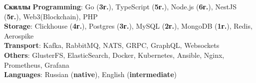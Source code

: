 \documentclass{resume}
\begin{document}
\begin{rSection}{\textbf{Скиллы}}
    \textbf{Programming}: Go ({\textbf{3г.}}), TypeScript ({\textbf{5г.}}), Node.js ({\textbf{6г.}}), NestJS ({\textbf{5г.}}), Web3(Blockchain), PHP
    \\ \textbf{Storage}: Clickhouse ({\textbf{4г.}}), Postgres ({\textbf{3г.}}), MySQL ({\textbf{2г.}}), MongoDB ({\textbf{1г.}}), Redis, Aerospike
    \\ \textbf{Transport}: Kafka, RabbitMQ, NATS, GRPC, GraphQL, Websockets
    \\ \textbf{Others}: GlusterFS, ElasticSearch, Docker, Kubernetes, Ansible, Nginx, Prometheus, Grafana
    \\ \textbf{Languages}: Russian ({\textbf{native}}), English ({\textbf{intermediate}})
\end{rSection}
\end{document}
